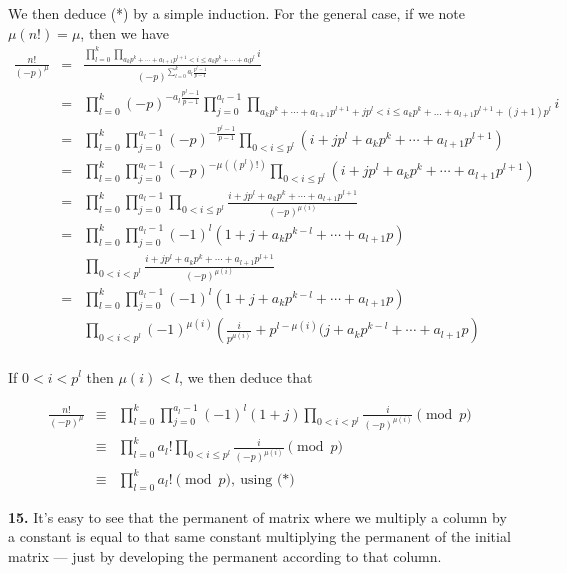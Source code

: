 \documentclass[a4paper,12pt]{article}
\newcommand{\newpar}[1]{\bigskip \noindent \textbf{#1.}}
\begin{document}
We then deduce (*) by a simple induction.  For the general case, if we
note $\mu(n!) = \mu$, then we have
\begin{eqnarray*}
  \frac{n!}{(-p)^{\mu}} &=& \frac{\prod_{l=0}^k \prod_{a_k
      p^k+\cdots+a_{l+1}p^{l+1} < i \le a_k p^k + \cdots + a_l p^l}
    i}{(-p)^{\sum_{l=0}^k a_l \frac{p^l-1}{p-1}}} \\
  &=& \prod_{l=0}^k (-p)^{-a_l\frac{p^l-1}{p-1}} \prod_{j=0}^{a_l - 1}
  \prod_{a_kp^k+\cdots+a_{l+1}p^{l+1} + jp^l < i \le a_k p^k + \ldots
    + a_{l+1}p^{l+1} + (j+1)p^l} i \\
  &=& \prod_{l=0}^k \prod_{j=0}^{a_l-1} (-p)^{-\frac{p^l-1}{p-1}}
  \prod_{0 < i \le p^l} (i + j p^l + a_k p^k + \cdots + a_{l+1}
  p^{l+1}) \\
  &=& \prod_{l=0}^k \prod_{j=0}^{a_l-1} (-p)^{-\mu((p^l)!)}
  \prod_{0 < i \le p^l} (i + j p^l + a_k p^k + \cdots + a_{l+1} p^{l+1}) \\
  &=& \prod_{l=0}^k \prod_{j=0}^{a_l-1} \prod_{0 < i \le p^l} \frac{i + j
    p^l + a_k p^k + \cdots + a_{l+1}p^{l+1}}{(-p)^{\mu(i)}} \\
  &=& \prod_{l=0}^k \prod_{j=0}^{a_l-1} (-1)^l (1+j + a_k p^{k-l} +
  \cdots + a_{l+1}p) \\
  &&\prod_{0 < i < p^l} \frac{i + j p^l + a_k p^k + \cdots +
    a_{l+1}p^{l+1}}{(-p)^{\mu(i)}} \\
  &=& \prod_{l=0}^k \prod_{j=0}^{a_l-1} (-1)^l (1+j + a_k p^{k-l} +
  \cdots + a_{l+1}p) \\
  &&\prod_{0 < i < p^l} (-1)^{\mu(i)} \left(\frac{i}{p^{\mu(i)}} +
  p^{l-\mu(i)} (j + a_k p^{k-l} + \cdots + a_{l+1}p\right) \\
\end{eqnarray*}

If $0 < i < p^l$ then $\mu(i) < l$, we then deduce that

\begin{eqnarray*}
  \frac{n!}{(-p)^\mu} &\equiv& \prod_{l=0}^k \prod_{j=0}^{a_l - 1}
  (-1)^l (1+j) \prod_{0<i<p^l} \frac{i}{(-p)^{\mu(i)}} \pmod p \\
  &\equiv& \prod_{l=0}^k a_l! \prod_{0<i\le p^l}
  \frac{i}{(-p)^{\mu(i)}} \pmod p \\
  &\equiv& \prod_{l=0}^k a_l! \pmod p,\ \mbox{using (*)}
\end{eqnarray*}

\newpar{15} It's easy to see that the permanent of matrix where we
multiply a column by a constant is equal to that same constant
multiplying the permanent of the initial matrix --- just by developing
the permanent according to that column.
\end{document}
